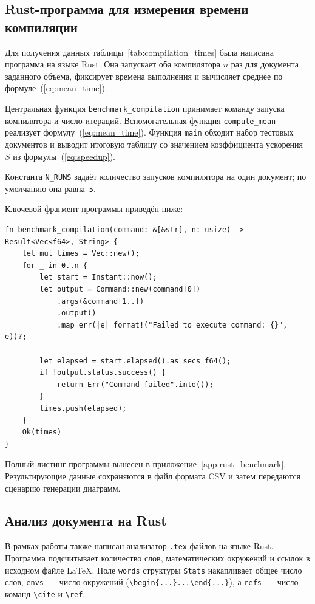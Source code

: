 \subsection{Rust-программа для измерения времени компиляции}

Для получения данных таблицы~\ref{tab:compilation_times} была написана программа на языке Rust. Она запускает оба компилятора $n$ раз для документа заданного объёма, фиксирует времена выполнения и вычисляет среднее по формуле~(\ref{eq:mean_time}).

Центральная функция \texttt{benchmark_compilation} принимает команду запуска компилятора и число итераций. Вспомогательная функция \texttt{compute_mean} реализует формулу~(\ref{eq:mean_time}). Функция \texttt{main} обходит набор тестовых документов и выводит итоговую таблицу со значением коэффициента ускорения $S$ из формулы~(\ref{eq:speedup}).

Константа \texttt{N_RUNS} задаёт количество запусков компилятора на один документ; по умолчанию она равна~\texttt{5}.

Ключевой фрагмент программы приведён ниже:

\begin{verbatim}
fn benchmark_compilation(command: &[&str], n: usize) -> Result<Vec<f64>, String> {
    let mut times = Vec::new();
    for _ in 0..n {
        let start = Instant::now();
        let output = Command::new(command[0])
            .args(&command[1..])
            .output()
            .map_err(|e| format!("Failed to execute command: {}", e))?;

        let elapsed = start.elapsed().as_secs_f64();
        if !output.status.success() {
            return Err("Command failed".into());
        }
        times.push(elapsed);
    }
    Ok(times)
}
\end{verbatim}

Полный листинг программы вынесен в приложение~\ref{app:rust_benchmark}. Результирующие данные сохраняются в файл формата CSV и затем передаются сценарию генерации диаграмм.

\subsection{Анализ документа на Rust}

В рамках работы также написан анализатор \texttt{.tex}-файлов на языке Rust. Программа подсчитывает количество слов, математических окружений и ссылок в исходном файле {\LaTeX}. Поле \texttt{words} структуры \texttt{Stats} накапливает общее число слов, \texttt{envs}~--- число окружений (\verb|\begin{...}...\end{...}|), а \texttt{refs}~--- число команд \verb|\cite| и \verb|\ref|.

